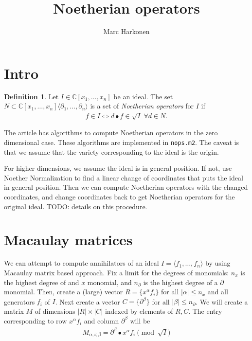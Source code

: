 \documentclass[letterpaper]{article}
\title{Noetherian operators}
\author{Marc Harkonen}
\theoremstyle{plain}
\theoremstyle{definition}
\newtheorem{definition}[theorem]{Definition}
\theoremstyle{remark}
\begin{document}
\maketitle
\section{Intro} %
\label{sec:intro}
\begin{definition}
	Let $I \in \mathbb{C}[x_1,\dotsc,x_n]$ be an ideal. The set $N \subset \mathbb{C}[x_1,\dotsc,x_n]\langle \partial_1 ,\dotsc, \partial_n \rangle$ is a set of \emph{Noetherian operators} for $I$ if
	\begin{align*}
		f \in I \iff d \bullet f \in \sqrt{I} \; \forall d \in N.
	\end{align*}
\end{definition}

The article \cite{damiano} has algorithms to compute Noetherian operators in the zero dimensional case. These algorithms are implemented in \texttt{nops.m2}. The caveat is that we assume that the variety corresponding to the ideal is the origin.

For higher dimensions, we assume the ideal is in general position. If not, use Noether Normalization to find a linear change of coordinates that puts the ideal in general position. Then we can compute Noetherian operators with the changed coordinates, and change coordinates back to get Noetherian operators for the original ideal. TODO: details on this procedure.


\section{Macaulay matrices} %
\label{sec:macaulay_matrices}
We can attempt to compute annihilators of an ideal $I = \langle f_1,\dotsc,f_n \rangle$ by using Macaulay matrix based approach. Fix a limit for the degrees of monomials: $n_x$ is the highest degree of and $x$ monomial, and $n_\partial$ is the highest degree of a $\partial$ monomial. Then, create a (large) vector $R = \{x^\alpha f_i\}$ for all $|\alpha| \leq n_x$ and all generators $f_i$ of $I$. Next create a vector $C = \{\partial^\beta\}$ for all $|\beta| \leq n_\partial$. We will create a matrix $M$ of dimensions $|R| \times |C|$ indexed by elements of $R,C$. The entry corresponding to row $x^\alpha f_i$ and column $\partial^\beta$ will be
\begin{align}
	M_{\alpha,i;\beta} = \partial^\beta \bullet x^\alpha f_i \pmod{\sqrt I} \label{eq:macaulay_matrix_entries}
\end{align}
\end{document}
